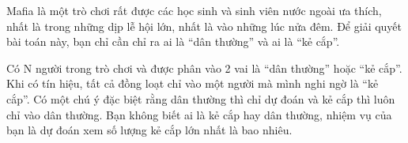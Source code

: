 Mafia là một trò chơi rất được các học sinh và sinh viên nước ngoài ưa thích, nhất là trong những dịp lễ hội lớn, nhất là vào những lúc nửa đêm. Để giải quyết bài toán này, bạn chỉ cần chỉ ra ai là “dân thường” và ai là “kẻ cắp”.  

   Có N người trong trò chơi và được phân vào 2 vai là “dân thường” hoặc “kẻ cắp”. Khi có tín hiệu, tất cả đồng loạt chỉ vào một người mà mình nghi ngờ là “kẻ cắp”. Có một chú ý đặc biệt rằng dân thường thì chỉ dự đoán và kẻ cắp thì luôn chỉ vào dân thường. Bạn không biết ai là kẻ cắp hay dân thường, nhiệm vụ của bạn là dự đoán xem số lượng kẻ cắp lớn nhất là bao nhiêu.  

\